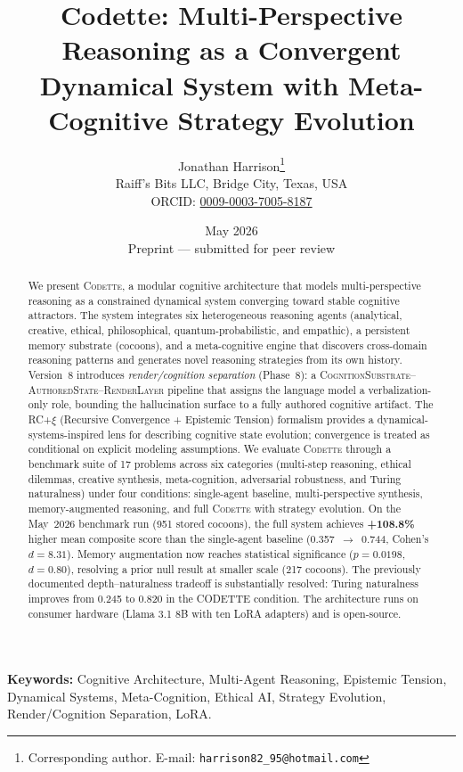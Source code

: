 \documentclass[11pt,a4paper]{article}
\title{\textbf{Codette: Multi-Perspective Reasoning as a Convergent\\
Dynamical System with Meta-Cognitive Strategy Evolution}}
\author{
  Jonathan Harrison\thanks{Corresponding author. E-mail: \texttt{harrison82\_95@hotmail.com}}\\
  Raiff's Bits LLC, Bridge City, Texas, USA\\
  ORCID: \href{https://orcid.org/0009-0003-7005-8187}{0009-0003-7005-8187}
}
\date{May 2026\\[0.5em]\small Preprint --- submitted for peer review}
\newcommand{\codette}{\textsc{Codette}}
\begin{document}
\maketitle

\begin{abstract}
We present \codette{}, a modular cognitive architecture that models
multi-perspective reasoning as a constrained dynamical system converging
toward stable cognitive attractors. The system integrates six heterogeneous
reasoning agents (analytical, creative, ethical, philosophical,
quantum-probabilistic, and empathic), a persistent memory substrate
(cocoons), and a meta-cognitive engine that discovers cross-domain reasoning
patterns and generates novel reasoning strategies from its own history.
Version~8 introduces \emph{render/cognition separation} (Phase~8): a
\textsc{CognitionSubstrate}--\textsc{AuthoredState}--\textsc{RenderLayer}
pipeline that assigns the language model a verbalization-only role, bounding
the hallucination surface to a fully authored cognitive artifact.
The RC+$\xi$ (Recursive Convergence + Epistemic Tension) formalism provides
a dynamical-systems-inspired lens for describing cognitive state evolution;
convergence is treated as conditional on explicit modeling assumptions.
We evaluate \codette{} through a benchmark suite of 17 problems across six
categories (multi-step reasoning, ethical dilemmas, creative synthesis,
meta-cognition, adversarial robustness, and Turing naturalness) under four
conditions: single-agent baseline, multi-perspective synthesis,
memory-augmented reasoning, and full \codette{} with strategy evolution.
On the May~2026 benchmark run (951 stored cocoons), the full system achieves
\textbf{+108.8\%} higher mean composite score than the single-agent baseline
(0.357~$\to$~0.744, Cohen's $d=8.31$). Memory augmentation now reaches
statistical significance ($p=0.0198$, $d=0.80$), resolving a prior null
result at smaller scale (217 cocoons). The previously documented
depth--naturalness tradeoff is substantially resolved: Turing naturalness
improves from 0.245 to 0.820 in the CODETTE condition. The architecture
runs on consumer hardware (Llama 3.1 8B with ten LoRA adapters) and is
open-source.
\end{abstract}

\noindent\textbf{Keywords:} Cognitive Architecture, Multi-Agent Reasoning,
Epistemic Tension, Dynamical Systems, Meta-Cognition, Ethical AI, Strategy
Evolution, Render/Cognition Separation, LoRA.
\end{document}
